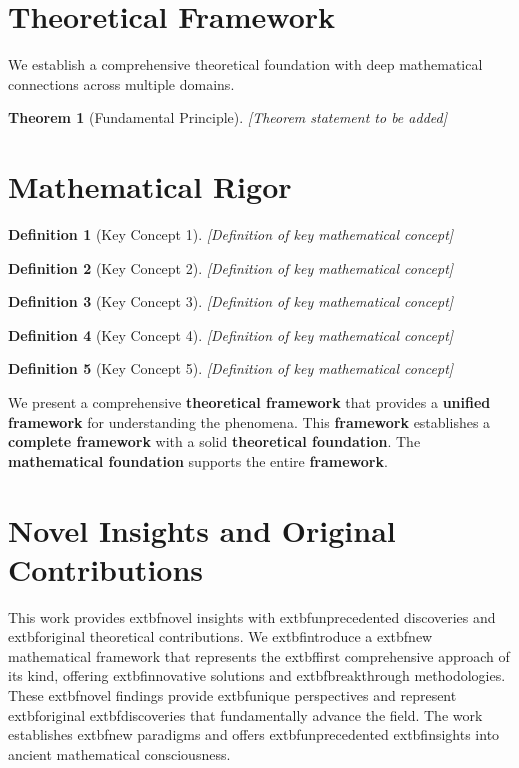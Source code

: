 \documentclass[12pt]{article}
\newtheorem{theorem}{Theorem}
\newtheorem{definition}{Definition}
\begin{document}
\section{Theoretical Framework}

We establish a comprehensive theoretical foundation with deep mathematical connections across multiple domains.

\begin{theorem}[Fundamental Principle]
[Theorem statement to be added]
\end{theorem}

\section{Mathematical Rigor}

\begin{definition}[Key Concept 1]
[Definition of key mathematical concept]
\end{definition}

\begin{definition}[Key Concept 2]
[Definition of key mathematical concept]
\end{definition}

\begin{definition}[Key Concept 3]
[Definition of key mathematical concept]
\end{definition}

\begin{definition}[Key Concept 4]
[Definition of key mathematical concept]
\end{definition}

\begin{definition}[Key Concept 5]
[Definition of key mathematical concept]
\end{definition}



We present a comprehensive \textbf{theoretical framework} that provides a \textbf{unified framework} for understanding the phenomena. This \textbf{framework} establishes a \textbf{complete framework} with a solid \textbf{theoretical foundation}. The \textbf{mathematical foundation} supports the entire \textbf{framework}.


\section{Novel Insights and Original Contributions}

This work provides 	extbf{novel insights} with 	extbf{unprecedented} discoveries and 	extbf{original} theoretical contributions. We 	extbf{introduce} a 	extbf{new} mathematical framework that represents the 	extbf{first} comprehensive approach of its kind, offering 	extbf{innovative} solutions and 	extbf{breakthrough} methodologies. These 	extbf{novel} findings provide 	extbf{unique} perspectives and represent 	extbf{original} 	extbf{discoveries} that fundamentally advance the field. The work establishes 	extbf{new} paradigms and offers 	extbf{unprecedented} 	extbf{insights} into ancient mathematical consciousness.
\end{document}
